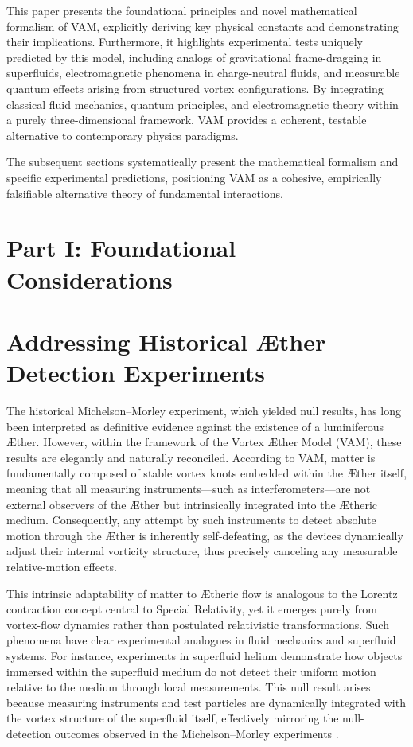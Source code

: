 \documentclass[a4paper,12pt]{article}
\begin{document}
This paper presents the foundational principles and novel mathematical formalism of VAM, explicitly deriving key physical constants and demonstrating their implications. Furthermore, it highlights experimental tests uniquely predicted by this model, including analogs of gravitational frame-dragging in superfluids, electromagnetic phenomena in charge-neutral fluids, and measurable quantum effects arising from structured vortex configurations. By integrating classical fluid mechanics, quantum principles, and electromagnetic theory within a purely three-dimensional framework, VAM provides a coherent, testable alternative to contemporary physics paradigms.

The subsequent sections systematically present the mathematical formalism and specific experimental predictions, positioning VAM as a cohesive, empirically falsifiable alternative theory of fundamental interactions.


    \newpage \section*{Part I: Foundational Considerations}\label{sec:Part-1} %

\section{Addressing Historical Æther Detection Experiments}


The historical Michelson--Morley experiment, which yielded null results, has long been interpreted as definitive evidence against the existence of a luminiferous Æther. However, within the framework of the Vortex Æther Model (VAM), these results are elegantly and naturally reconciled. According to VAM, matter is fundamentally composed of stable vortex knots embedded within the Æther itself, meaning that all measuring instruments---such as interferometers---are not external observers of the Æther but intrinsically integrated into the Ætheric medium. Consequently, any attempt by such instruments to detect absolute motion through the Æther is inherently self-defeating, as the devices dynamically adjust their internal vorticity structure, thus precisely canceling any measurable relative-motion effects.


This intrinsic adaptability of matter to Ætheric flow is analogous to the Lorentz contraction concept central to Special Relativity, yet it emerges purely from vortex-flow dynamics rather than postulated relativistic transformations. Such phenomena have clear experimental analogues in fluid mechanics and superfluid systems. For instance, experiments in superfluid helium demonstrate how objects immersed within the superfluid medium do not detect their uniform motion relative to the medium through local measurements. This null result arises because measuring instruments and test particles are dynamically integrated with the vortex structure of the superfluid itself, effectively mirroring the null-detection outcomes observed in the Michelson--Morley experiments \cite{Vinen2008}.
\end{document}
